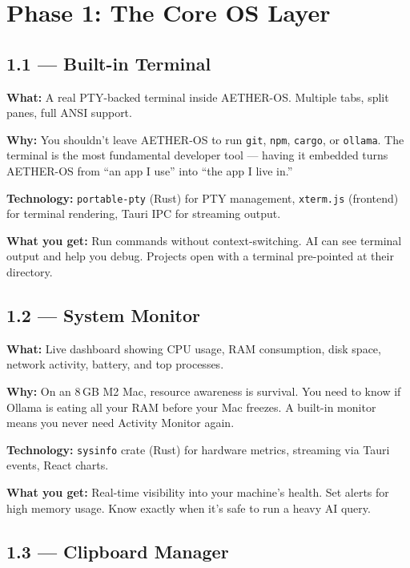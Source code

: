 \documentclass[11pt,a4paper]{article}
\begin{document}
\section{Phase 1: The Core OS Layer}

\subsection{1.1 --- Built-in Terminal}

\textbf{What:} A real PTY-backed terminal inside AETHER-OS. Multiple tabs, split panes, full ANSI support.

\textbf{Why:} You shouldn't leave AETHER-OS to run \texttt{git}, \texttt{npm}, \texttt{cargo}, or \texttt{ollama}. The terminal is the most fundamental developer tool --- having it embedded turns AETHER-OS from ``an app I use'' into ``the app I live in.''

\textbf{Technology:} \texttt{portable-pty} (Rust) for PTY management, \texttt{xterm.js} (frontend) for terminal rendering, Tauri IPC for streaming output.

\textbf{What you get:} Run commands without context-switching. AI can see terminal output and help you debug. Projects open with a terminal pre-pointed at their directory.

\subsection{1.2 --- System Monitor}

\textbf{What:} Live dashboard showing CPU usage, RAM consumption, disk space, network activity, battery, and top processes.

\textbf{Why:} On an 8\,GB M2 Mac, resource awareness is survival. You need to know if Ollama is eating all your RAM before your Mac freezes. A built-in monitor means you never need Activity Monitor again.

\textbf{Technology:} \texttt{sysinfo} crate (Rust) for hardware metrics, streaming via Tauri events, React charts.

\textbf{What you get:} Real-time visibility into your machine's health. Set alerts for high memory usage. Know exactly when it's safe to run a heavy AI query.

\subsection{1.3 --- Clipboard Manager}
\end{document}
